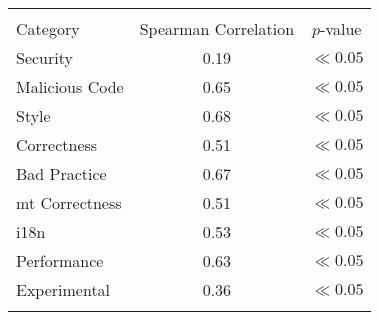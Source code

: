 
\begin{tabular}{lcc}
\hline \\
Category & Spearman Correlation & $p$-value \\ \hline 
Security & 0.19 & $\ll 0.05$\\
Malicious Code & 0.65 & $\ll 0.05$\\
Style & 0.68 & $\ll 0.05$\\
Correctness & 0.51 & $\ll 0.05$\\
Bad Practice & 0.67 & $\ll 0.05$\\
{\sc mt} Correctness & 0.51 & $\ll 0.05$\\
i18n & 0.53 & $\ll 0.05$\\
Performance & 0.63 & $\ll 0.05$\\
Experimental & 0.36 & $\ll 0.05$\\
\hline \\
\end{tabular}
